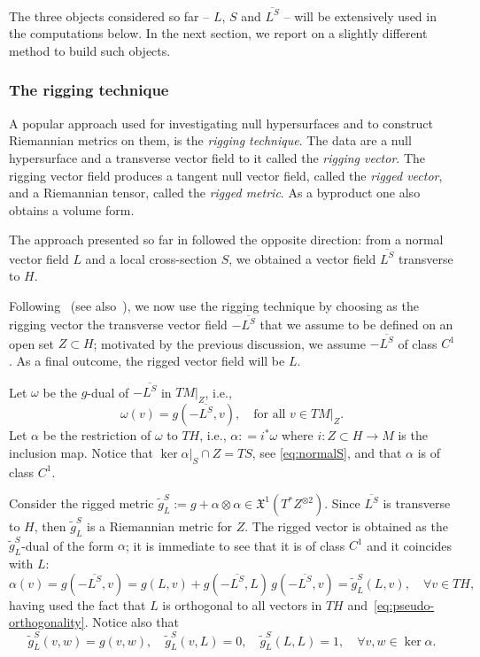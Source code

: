 \documentclass[12pt,a4paper]{amsart}
\theoremstyle{plain}
\theoremstyle{definition}
\numberwithin{equation}{section}
\newcommand{\vfield}{\mathfrak{X}}
\begin{document}
The three objects considered so far -- $L$, $S$ and $\overline{L^S}$ -- will be extensively used in the computations below. In the next section, we report on a slightly different method to build such objects. 


\subsubsection{The rigging technique}\label{SubSec:RiggingTech}
%
A popular approach used for investigating null hypersurfaces and to construct Riemannian metrics on them, is the \emph{rigging technique}.
%
The data are a null hypersurface and a transverse vector field to it called the \emph{rigging vector}.
%
The rigging vector field produces a tangent null vector field, called
the \emph{rigged vector}, and a Riemannian tensor, called the \emph{rigged
  metric}. As a byproduct  one also obtains a volume form.

The approach presented so far in  followed the opposite direction:
from a normal vector field $L$ and a local cross-section $S$, we obtained  a vector field $\overline{L^S}$ transverse to $H$.


Following~\cite{Rigging} (see also~\cite[Sect.~2.6]{MinguzziCMP15}), we now use the rigging technique by choosing as the rigging vector the
transverse vector field $-\overline{L^S}$ that we assume to be defined on an open set $Z\subset H$; 
motivated by the previous discussion, we assume $-\overline{L^S}$  of class $C^{1}$.
As a final outcome, the rigged vector field will be $L$.
%
%

Let $\omega$ be the $g$-dual of $-\overline{L^S}$ in $TM|_Z$, i.e.,
$$
\omega(v)=g(-\overline{L^S},v),
\quad \text{for all } v\in TM|_Z. 
$$ 
Let $\alpha$ be
the restriction of $\omega$ to $TH$, i.e., $\alpha : = i^* \omega$ where $i : Z\subset  H \to M$
is the inclusion map. %
Notice that $\ker\alpha|_S \cap Z=TS$, see 
\eqref{eq:normalS}, and that $\alpha$ is of class $C^{1}$.
% 

Consider the rigged metric $\tilde{g}_L^S:= g+\alpha\otimes\alpha\in
\vfield^{1} (T^*Z^{\otimes 2})$.
%
Since $\overline{L^S}$ is transverse to $H$, then 
$\tilde{g}_L^S$ is a Riemannian metric for $Z$. 
%
The rigged vector is obtained as the $\tilde{g}_L^S$-dual of the
form $\alpha$; it is immediate to see that it is of class $C^{1}$ and it coincides with $L$:
\begin{equation}
  \alpha(v)
  =
  g(-\overline{L^S},v)
  =
  g(L,v)
  +
  g(-\overline{L^S},L)\, 
  g(-\overline{L^S},v)
  =
  \tilde{g}_L^S(L,v)
  ,\quad
  \forall v\in TH
  ,
\end{equation}
having used the fact that $L$ is orthogonal to all vectors in $TH$
and~\eqref{eq:pseudo-orthogonality}.  Notice also that
\begin{equation}
  \label{eq:rigged-metric}
  \tilde{g}^S_L
  (v,w)
  =
  g(v,w)
  ,
  \quad
  \tilde{g}^S_L
  (v, L)
  =
  0,
  \quad
  \tilde{g}^S_L
  (L, L)
  =
  1
  ,
  \quad
  \forall v,w\in \ker\alpha
  .
\end{equation}
%
\end{document}
